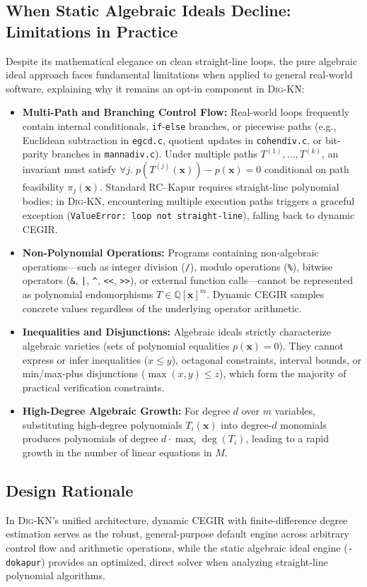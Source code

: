 \documentclass[runningheads]{llncs}
\newcommand{\tool}{\textsc{Dig-KN}\xspace}
\newcommand{\code}[1]{\texttt{\small #1}}
\begin{document}
\subsection{When Static Algebraic Ideals Decline: Limitations in Practice}
Despite its mathematical elegance on clean straight-line loops, the pure algebraic ideal approach faces fundamental limitations when applied to general real-world software, explaining why it remains an opt-in component in \tool{}:
\begin{itemize}[leftmargin=1.5em]
\item \textbf{Multi-Path and Branching Control Flow:} Real-world loops frequently contain internal conditionals, \code{if}-\code{else} branches, or piecewise paths (e.g., Euclidean subtraction in \code{egcd.c}, quotient updates in \code{cohendiv.c}, or bit-parity branches in \code{mannadiv.c}). Under multiple paths $T^{(1)}, \dots, T^{(k)}$, an invariant must satisfy $\forall j.\; p(T^{(j)}(\mathbf{x})) - p(\mathbf{x}) = 0$ conditional on path feasibility $\pi_j(\mathbf{x})$. Standard RC--Kapur requires straight-line polynomial bodies; in \tool{}, encountering multiple execution paths triggers a graceful exception (\code{ValueError: loop not straight-line}), falling back to dynamic CEGIR.
\item \textbf{Non-Polynomial Operations:} Programs containing non-algebraic operations---such as integer division (\code{/}), modulo operations (\code{\%}), bitwise operators (\code{\&}, \code{|}, \code{\^}, \code{<<}, \code{>>}), or external function calls---cannot be represented as polynomial endomorphisms $T \in \mathbb{Q}[\mathbf{x}]^m$. Dynamic CEGIR samples concrete values regardless of the underlying operator arithmetic.
\item \textbf{Inequalities and Disjunctions:} Algebraic ideals strictly characterize algebraic varieties (sets of polynomial equalities $p(\mathbf{x}) = 0$). They cannot express or infer inequalities ($x \le y$), octagonal constraints, interval bounds, or min/max-plus disjunctions ($\max(x, y) \le z$), which form the majority of practical verification constraints.
\item \textbf{High-Degree Algebraic Growth:} For degree $d$ over $m$ variables, substituting high-degree polynomials $T_i(\mathbf{x})$ into degree-$d$ monomials produces polynomials of degree $d \cdot \max_i \deg(T_i)$, leading to a rapid growth in the number of linear equations in $M$.
\end{itemize}

\subsection{Design Rationale}
In \tool{}'s unified architecture, dynamic CEGIR with finite-difference degree estimation serves as the robust, general-purpose default engine across arbitrary control flow and arithmetic operations, while the static algebraic ideal engine (\code{-dokapur}) provides an optimized, direct solver when analyzing straight-line polynomial algorithms.
\end{document}
